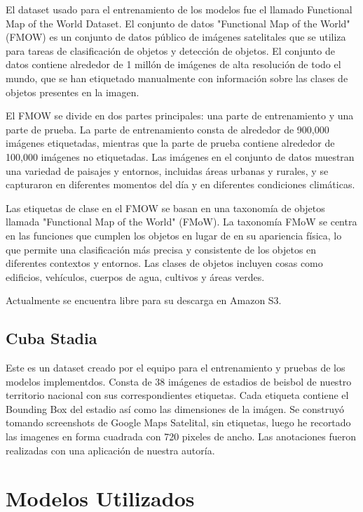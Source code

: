 \documentclass[article]{llncs}
\begin{document}
El dataset usado para el entrenamiento de los modelos fue el llamado Functional Map of the World Dataset. 
El conjunto de datos "Functional Map of the World" (FMOW) es un conjunto de datos público de imágenes satelitales 
que se utiliza para tareas de clasificación de objetos y detección de objetos. El conjunto de datos contiene alrededor 
de 1 millón de imágenes de alta resolución de todo el mundo, que se han etiquetado manualmente con información sobre 
las clases de objetos presentes en la imagen.

El FMOW se divide en dos partes principales: una parte de entrenamiento y una parte de prueba. La parte de entrenamiento 
consta de alrededor de 900,000 imágenes etiquetadas, mientras que la parte de prueba contiene alrededor de 100,000 
imágenes no etiquetadas. Las imágenes en el conjunto de datos muestran una variedad de paisajes y entornos, incluidas 
áreas urbanas y rurales, y se capturaron en diferentes momentos del día y en diferentes condiciones climáticas.

Las etiquetas de clase en el FMOW se basan en una taxonomía de objetos llamada "Functional Map of the World" (FMoW). La 
taxonomía FMoW se centra en las funciones que cumplen los objetos en lugar de en su apariencia física, lo que permite 
una clasificación más precisa y consistente de los objetos en diferentes contextos y entornos. Las clases de objetos 
incluyen cosas como edificios, vehículos, cuerpos de agua, cultivos y áreas verdes.

Actualmente se encuentra libre para su descarga en Amazon S3.

\subsection{Cuba Stadia}

Este es un dataset creado por el equipo para el entrenamiento y pruebas de los modelos implementdos. Consta de 38 
im\'agenes de estadios de beisbol de nuestro territorio nacional con sus correspondientes etiquetas. Cada etiqueta 
contiene el Bounding Box del estadio as\'i como las dimensiones de la im\'agen. Se construy\'o tomando screenshots 
de Google Maps Satelital, sin etiquetas, luego he recortado las imagenes en forma cuadrada con 720 pixeles de ancho. 
Las anotaciones fueron realizadas con una aplicaci\'on de nuestra autor\'ia.

\section{Modelos Utilizados}
\end{document}
